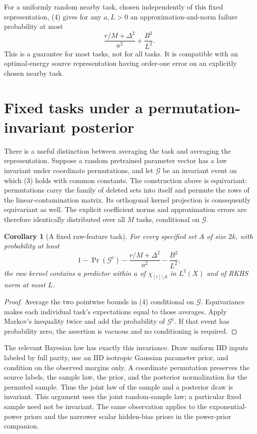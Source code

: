 \documentclass[11pt]{article}
\newtheorem{corollary}[theorem]{Corollary}
\begin{document}
For a uniformly random nearby task, chosen independently of this fixed
representation, (4) gives for any $a,L>0$ an approximation-and-norm
failure probability at most
\[
                   \frac{r/M+\Delta^2}{a^2}+\frac{B^2}{L^2}.
 \tag{7}
\]
This is a guarantee for most tasks, not for all tasks. It is compatible
with an optimal-energy source representation having order-one error on
an explicitly chosen nearby task.

\section{Fixed tasks under a permutation-invariant posterior}
There is a useful distinction between averaging the task and averaging
the representation. Suppose a random pretrained parameter vector has a
law invariant under coordinate permutations, and let $\mathcal G$ be an
invariant event on which (3) holds with common constants. The construction
above is equivariant: permutations carry the family of deleted sets into
itself and permute the rows of the linear-contamination matrix. Its
orthogonal kernel projection is consequently equivariant as well.
The explicit coefficient norms and approximation errors are therefore
identically distributed over all $M$ tasks, conditional on $\mathcal G$.

\begin{corollary}[A fixed raw-feature task]
For every specified set $A$ of size $2k$, with probability at least
\[
 1-\Pr(\mathcal G^c)-\frac{r/M+\Delta^2}{a^2}-\frac{B^2}{L^2},
 \tag{8}
\]
the raw kernel contains a predictor within $a$ of
$\chi_{[r]\setminus A}$ in $L^2(X)$ and of RKHS norm at most $L$.
\end{corollary}
\begin{proof}
Average the two pointwise bounds in (4) conditional on $\mathcal G$.
Equivariance makes each individual task's expectations equal to those
averages. Apply Markov's inequality twice and add the probability of
$\mathcal G^c$. If that event has probability zero, the assertion is
vacuous and no conditioning is required.
\end{proof}

The relevant Bayesian law has exactly this invariance. Draw uniform IID
inputs labeled by full parity, use an IID isotropic Gaussian parameter
prior, and condition on the observed margins only. A coordinate
permutation preserves the source labels, the sample law, the prior, and
the posterior normalization for the permuted sample. Thus the joint law
of the sample and a posterior draw is invariant. This argument uses the
joint random-sample law; a particular fixed sample need not be invariant.
The same observation applies to the exponential-power priors and the
narrower scalar hidden-bias priors in the power-prior companion.
\end{document}
